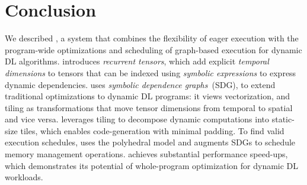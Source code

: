 \section{Conclusion}


We described \sys{}, a system that combines the flexibility of eager execution with the program-wide optimizations and scheduling of graph-based execution for dynamic DL algorithms. \sys{} introduces \emph{recurrent tensors}, which add explicit \emph{temporal dimensions} to tensors that can be indexed using \emph{symbolic expressions} to express dynamic dependencies. \sys uses \emph{symbolic dependence graphs}~(SDG), to extend traditional optimizations to dynamic DL programs: it views vectorization, and tiling as transformations that move tensor dimensions from temporal to spatial and vice versa. \sys{} leverages tiling to decompose dynamic computations into static-size tiles, which enables code-generation with minimal padding. To find valid execution schedules, \sys{} uses the polyhedral model and augments SDGs to schedule memory management operations. \sys{} achieves substantial performance speed-ups, which demonstrates its potential of whole-program optimization for dynamic DL workloads.



